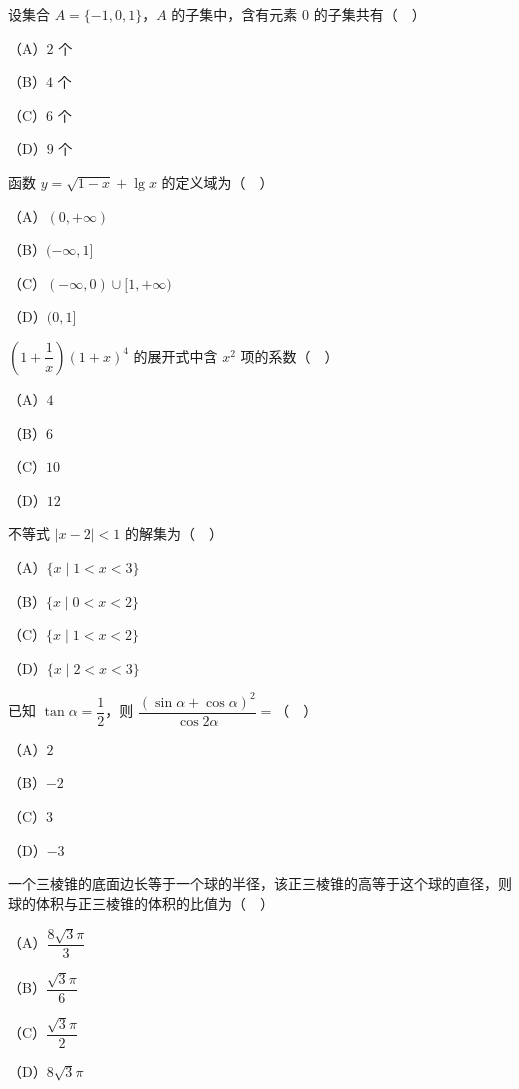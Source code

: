 


\begin{question}
设集合 $A=\{-1,0,1\}$，$A$ 的子集中，含有元素 $0$ 的子集共有（　）

（A）$2$ 个

（B）$4$ 个

（C）$6$ 个

（D）$9$ 个

\end{question}
\begin{question}
函数 $y=\sqrt{1-x}+\lg x$ 的定义域为（　）

（A）$(0,+\infty)$

（B）$(-\infty,1]$

（C）$(-\infty,0)\cup[1,+\infty)$

（D）$(0,1]$

\end{question}
\begin{question}
$\left(1+\dfrac1x\right)(1+x)^4$ 的展开式中含 $x^2$ 项的系数（　）

（A）$4$

（B）$6$

（C）$10$

（D）$12$

\end{question}
\begin{question}
不等式 $|x-2|<1$ 的解集为（　）

（A）$\{x\mid 1<x<3\}$

（B）$\{x\mid 0<x<2\}$

（C）$\{x\mid 1<x<2\}$

（D）$\{x\mid 2<x<3\}$

\end{question}
\begin{question}
已知 $\tan\alpha=\dfrac12$，则 $\dfrac{(\sin\alpha+\cos\alpha)^2}{\cos2\alpha}=$（　）

（A）$2$

（B）$-2$

（C）$3$

（D）$-3$

\end{question}
\begin{question}
一个三棱锥的底面边长等于一个球的半径，该正三棱锥的高等于这个球的直径，则球的体积与正三棱锥的体积的比值为（　）

（A）$\dfrac{8\sqrt3\pi}3$

（B）$\dfrac{\sqrt3\pi}6$

（C）$\dfrac{\sqrt3\pi}2$

（D）$8\sqrt3\pi$

\end{question}
